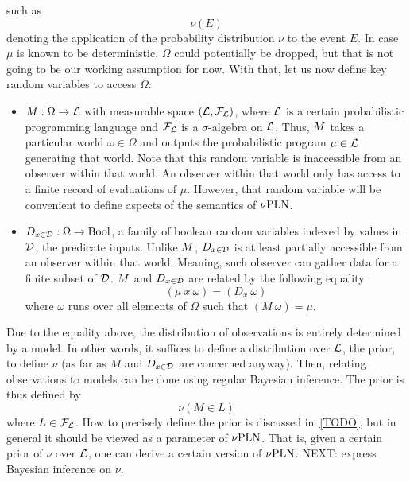 \documentclass[]{article}
\begin{document}
such as
$$\nu(E)$$ denoting the application of the probability distribution
$\nu$ to the event $E$.  In case $\mu$ is known to be deterministic,
$\Omega$ could potentially be dropped, but that is not going to be our
working assumption for now.  With that, let us now define key random
variables to access $\Omega$:
\begin{itemize}
\item $M : \Omega \to \mathcal{L}$ with measurable space
  $(\mathcal{L}, \mathcal{F}_{\mathcal{L}})$, where $\mathcal{L}$ is a certain
  probabilistic programming language and $\mathcal{F}_{\mathcal{L}}$ is a
  $\sigma$-algebra on $\mathcal{L}$.  Thus, $M$ takes a particular
  world $\omega \in \Omega$ and outputs the probabilistic program $\mu
  \in \mathcal{L}$ generating that world.  Note that this random
  variable is inaccessible from an observer within that world.  An
  observer within that world only has access to a finite record of
  evaluations of $\mu$.  However, that random variable will be
  convenient to define aspects of the semantics of $\nu\textup{PLN}$.
\item $D_{x\in\mathcal{D}} : \Omega \to \textup{Bool}$, a family of boolean random variables
  indexed by values in $\mathcal{D}$, the predicate inputs.  Unlike
  $M$, $D_{x\in\mathcal{D}}$ is at least partially accessible from an observer
  within that world.  Meaning, such observer can gather data for a
  finite subset of $\mathcal{D}$.  $M$ and $D_{x\in\mathcal{D}}$ are related by the
  following equality
  $$(\mu\ x\ \omega) = (D_x\ \omega)$$ where $\omega$ runs over all
  elements of $\Omega$ such that $(M\ \omega) = \mu$.
\end{itemize}
Due to the equality above, the distribution of observations is
entirely determined by a model.  In other words, it suffices to define
a distribution over $\mathcal{L}$, the prior, to define $\nu$ (as far as
$M$ and $D_{x\in\mathcal{D}}$ are concerned anyway).  Then, relating observations to
models can be done using regular Bayesian inference.  The prior is
thus defined by
$$\nu(M \in L)$$ where $L \in \mathcal{F}_{\mathcal{L}}$.  How to precisely
define the prior is discussed in~\ref{TODO}, but in general it should
be viewed as a parameter of $\nu\textup{PLN}$.  That is, given a certain prior
of $\nu$ over $\mathcal{L}$, one can derive a certain version of
$\nu\textup{PLN}$.  NEXT: express Bayesian inference on $\nu$.
\end{document}
